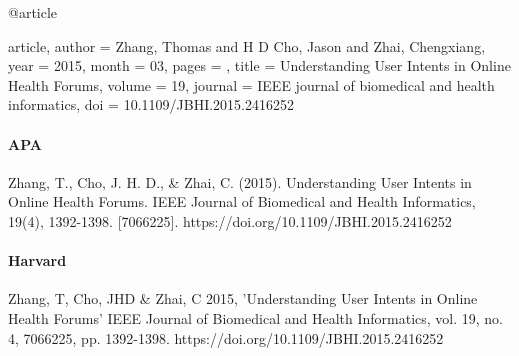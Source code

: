 \documentclass[11pt]{article}
\begin{document}
@article{article,
author = {Zhang, Thomas and H D Cho, Jason and Zhai, Chengxiang},
year = {2015},
month = {03},
pages = {},
title = {Understanding User Intents in Online Health Forums},
volume = {19},
journal = {IEEE journal of biomedical and health informatics},
doi = {10.1109/JBHI.2015.2416252}

}

\paragraph{APA}

Zhang, T., Cho, J. H. D., \& Zhai, C. (2015). Understanding User Intents in Online Health Forums. IEEE Journal of Biomedical and Health Informatics, 19(4), 1392-1398. [7066225]. https://doi.org/10.1109/JBHI.2015.2416252

\paragraph{Harvard}

Zhang, T, Cho, JHD \& Zhai, C 2015, 'Understanding User Intents in Online Health Forums' IEEE Journal of Biomedical and Health Informatics, vol. 19, no. 4, 7066225, pp. 1392-1398. https://doi.org/10.1109/JBHI.2015.2416252
\end{document}
